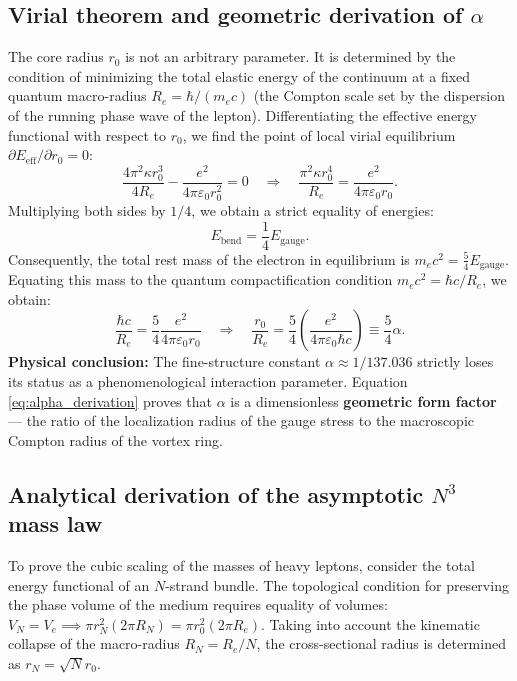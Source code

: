 \documentclass[11pt,a4paper]{article}
\begin{document}
\subsection{Virial theorem and geometric derivation of $\alpha$}
The core radius $r_0$ is not an arbitrary parameter. It is determined by the condition of minimizing the total elastic energy of the continuum at a fixed quantum macro-radius $R_e = \hbar / (m_e c)$ (the Compton scale set by the dispersion of the running phase wave of the lepton).
Differentiating the effective energy functional with respect to $r_0$, we find the point of local virial equilibrium $\partial E_{\text{eff}} / \partial r_0 = 0$:
\begin{equation}
\frac{4 \pi^2 \kappa r_0^3}{4R_e} - \frac{e^2}{4\pi\varepsilon_0 r_0^2} = 0 \quad \Longrightarrow \quad \frac{\pi^2 \kappa r_0^4}{R_e} = \frac{e^2}{4\pi\varepsilon_0 r_0}.
\end{equation}
Multiplying both sides by $1/4$, we obtain a strict equality of energies:
\begin{equation}
E_{\text{bend}} = \frac{1}{4} E_{\text{gauge}}.
\end{equation}
Consequently, the total rest mass of the electron in equilibrium is $m_e c^2 = \frac{5}{4} E_{\text{gauge}}$. Equating this mass to the quantum compactification condition $m_e c^2 = \hbar c / R_e$, we obtain:
\begin{equation}
\frac{\hbar c}{R_e} = \frac{5}{4} \frac{e^2}{4\pi\varepsilon_0 r_0} \quad \Longrightarrow \quad \frac{r_0}{R_e} = \frac{5}{4} \left( \frac{e^2}{4\pi\varepsilon_0 \hbar c} \right) \equiv \frac{5}{4} \alpha.
\label{eq:alpha_derivation}
\end{equation}
\textbf{Physical conclusion:} The fine-structure constant $\alpha \approx 1/137.036$ strictly loses its status as a phenomenological interaction parameter. Equation \eqref{eq:alpha_derivation} proves that $\alpha$ is a dimensionless \textbf{geometric form factor} --- the ratio of the localization radius of the gauge stress to the macroscopic Compton radius of the vortex ring.

\subsection{Analytical derivation of the asymptotic $N^3$ mass law}
To prove the cubic scaling of the masses of heavy leptons, consider the total energy functional of an $N$-strand bundle. The topological condition for preserving the phase volume of the medium requires equality of volumes: $V_N = V_e \implies \pi r_N^2 (2\pi R_N) = \pi r_0^2 (2\pi R_e)$. Taking into account the kinematic collapse of the macro-radius $R_N = R_e / N$, the cross-sectional radius is determined as $r_N = \sqrt{N} r_0$.
\end{document}
